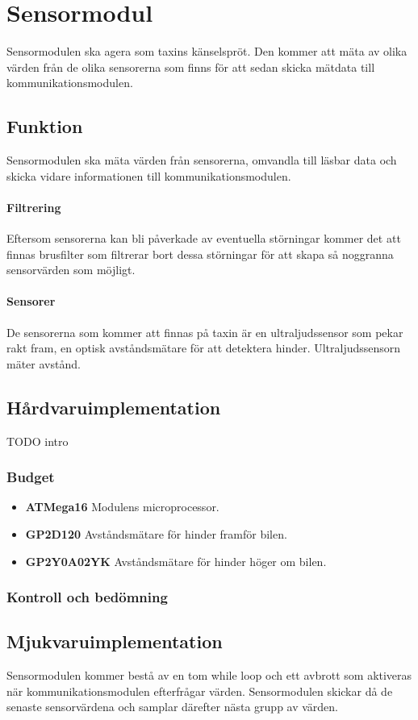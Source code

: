 \documentclass[designspec/spec.tex]{subfiles}
\begin{document}
\section{Sensormodul}
Sensormodulen ska agera som taxins känselspröt. Den kommer att mäta av olika
värden från de olika sensorerna som finns för att sedan skicka mätdata till
kommunikationsmodulen.

\subsection{Funktion}
Sensormodulen ska mäta värden från sensorerna, omvandla till läsbar data och
skicka vidare informationen till kommunikationsmodulen.

\paragraph{Filtrering}
Eftersom sensorerna kan bli påverkade av eventuella störningar kommer det att
finnas brusfilter som filtrerar bort dessa störningar för att skapa så
noggranna sensorvärden som möjligt.

\paragraph{Sensorer}
De sensorerna som kommer att finnas på taxin är en ultraljudssensor som pekar
rakt fram, en optisk avståndsmätare för att detektera hinder.
Ultraljudssensorn mäter avstånd.

\subsection{Hårdvaruimplementation} 
TODO intro

\subsubsection{Budget}

\begin{itemize}
	\item \textbf{ATMega16} Modulens microprocessor. 
    \item \textbf{GP2D120} Avståndsmätare för hinder framför bilen.
    \item \textbf{GP2Y0A02YK} Avståndsmätare för hinder höger om bilen.
\end{itemize}

\subsubsection{Kontroll och bedömning}

\subsection{Mjukvaruimplementation} 
Sensormodulen kommer bestå av en tom while loop och ett avbrott som aktiveras
när kommunikationsmodulen efterfrågar värden. Sensormodulen skickar då de
senaste sensorvärdena och samplar därefter nästa grupp av värden.
\end{document}
